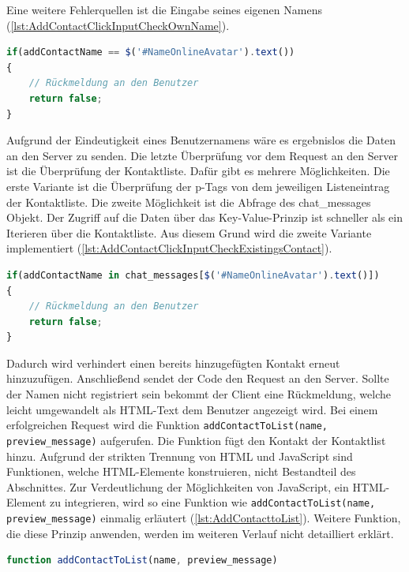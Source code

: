 \documentclass[a4paper,titlepage,halfparskip,12pt]{scrreprt}
\begin{document}
\begin{onehalfspacing}
\pagebreak

Eine weitere Fehlerquellen ist die Eingabe seines eigenen Namens (\autoref{lst:AddContactClickInputCheckOwnName}).
\begin{lstlisting}[language=Javascript,caption=Überprüfung der Eingabe auf eigenen Namen,label={lst:AddContactClickInputCheckOwnName}]
if(addContactName == $('#NameOnlineAvatar').text())
{
	// Rückmeldung an den Benutzer
	return false;
}
\end{lstlisting} 
Aufgrund der Eindeutigkeit eines Benutzernamens wäre es ergebnislos die Daten an den Server zu senden. Die letzte Überprüfung vor dem Request an den Server ist die Überprüfung der Kontaktliste. Dafür gibt es mehrere Möglichkeiten. Die erste Variante ist die Überprüfung der p-Tags von dem jeweiligen Listeneintrag der Kontaktliste. Die zweite Möglichkeit ist die Abfrage des chat\_messages Objekt. Der Zugriff auf die Daten über das Key-Value-Prinzip ist schneller als ein Iterieren über die Kontaktliste. Aus diesem Grund wird die zweite Variante implementiert (\autoref{lst:AddContactClickInputCheckExistingsContact}).
\begin{lstlisting}[language=Javascript,caption=Überprüfung der Eingabe einen bereits vorhandenen Kontakt,label={lst:AddContactClickInputCheckExistingsContact}]
if(addContactName in chat_messages[$('#NameOnlineAvatar').text()])
{
	// Rückmeldung an den Benutzer
	return false;
}
\end{lstlisting} 
Dadurch wird verhindert einen bereits hinzugefügten Kontakt erneut hinzuzufügen. Anschließend sendet der Code den Request an den Server. Sollte der Namen nicht registriert sein bekommt der Client eine Rückmeldung, welche leicht umgewandelt als \ac{HTML}-Text dem Benutzer angezeigt wird. Bei einem erfolgreichen Request wird die Funktion \texttt{addContactToList(name, preview\_message)} aufgerufen. Die Funktion fügt den Kontakt der Kontaktlist hinzu. Aufgrund der strikten Trennung von HTML und JavaScript sind Funktionen, welche HTML-Elemente konstruieren, nicht Bestandteil des Abschnittes. Zur Verdeutlichung der Möglichkeiten von JavaScript, ein HTML-Element zu integrieren, wird so eine Funktion wie \texttt{addContactToList(name, preview\_message)} einmalig erläutert (\autoref{lst:AddContacttoList}). Weitere Funktion, die diese Prinzip anwenden, werden im weiteren Verlauf nicht detailliert erklärt.
\begin{lstlisting}[language=Javascript,caption=Hinzufügen des Kontaktes mithilfe von HTML-Elementen,label={lst:AddContacttoList}]
function addContactToList(name, preview_message)

\end{lstlisting}
\end{onehalfspacing}
\end{document}
